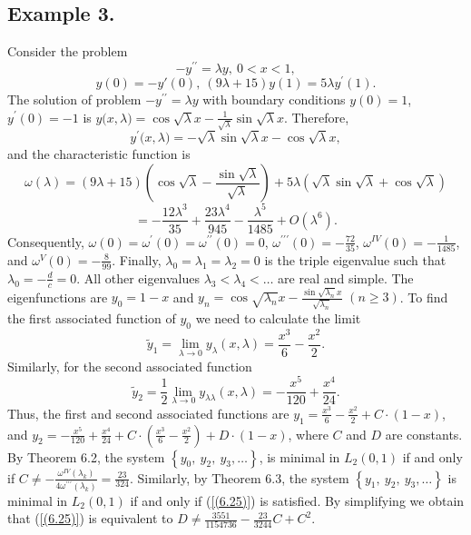 \documentclass[pdflatex,sn-mathphys-num]{sn-jnl}%
\theoremstyle{thmstyleone}%
\theoremstyle{thmstyletwo}%
\theoremstyle{thmstylethree}%
\theoremstyle{definition}
\theoremstyle{remark}
\numberwithin{equation}{section}
\begin{document}
\subsection*{Example 3.}Consider the problem  
$$
-y^{\prime \prime }=\lambda y,\ 0<x<1,
$$
$$
y(0)=-y'(0),\ 
(9{\lambda}+15)y(1)= 5{\lambda }y^{\prime }(1).
$$
The solution of problem $-y^{\prime \prime }=\lambda y$ with boundary conditions $y(0)=1$, $y^\prime(0)=-1$ is $y({x,\lambda)}=\cos{\sqrt{\lambda}x}-\frac{1}{\sqrt{\lambda}}\sin{\sqrt{\lambda}x}$. Therefore, $$y^\prime({x,\lambda)}=-\sqrt{\lambda}\sin{\sqrt{\lambda}x}-\cos{\sqrt{\lambda}x},$$and
the characteristic function is $$\omega(\lambda) = (9{\lambda}+15)\left(\cos{\sqrt{\lambda}}-\frac{\sin{\sqrt{\lambda}}}{{\sqrt{\lambda}}} \right)+5\lambda\left(\sqrt{\lambda}\sin{\sqrt{\lambda}} +\cos{\sqrt{\lambda}}\right)
$$
$$
=-\frac{12\lambda^{3}}{35}+\frac{23\lambda^{4}}{945}-\frac{\lambda^{5}}{1485}+O(\lambda^{6}).
$$
Consequently, $\omega(0)=\omega^\prime(0)=\omega^{\prime\prime}(0)=0$, $\omega^{\prime\prime\prime}(0)=-\frac{72}{35}$, $\omega^{IV}(0)=-\frac{1}{1485}$, and $\omega^{V}(0)=-\frac{8}{99}$.
Finally, $\lambda _{0}=\lambda _{1}=\lambda _{2}=0$ is the triple eigenvalue such that $\lambda _{0}=-\frac{d}{c}=0$. All other eigenvalues $\lambda _{3}<\lambda _{4}<\ldots$ are real and simple.
The eigenfunctions are $y_{0}=1-x$ and $y_{n}=\cos{\sqrt{\lambda _{n}}x}-\frac{\sin{\sqrt{\lambda_n}x}}{{\sqrt{\lambda_n}}}$ $(n\ge 3)$.
To find the first associated function of $y_{0}$ we need to calculate the limit
$$\tilde{y}_1=\lim_{\lambda\to 0}y_\lambda(x,\lambda)=\frac{x^3}{6}-\frac{x^2}{2}.$$
Similarly, for the second associated function
$$\tilde{y}_2=\frac{1}{2}\lim_{\lambda\to 0}y_{\lambda\lambda}(x,\lambda)=-\frac{x^5}{120}+\frac{x^4}{24}.$$
Thus, the first and second associated functions are 
$y_{1}=\frac{x^{3}}{6}-\frac{x^{2}}{2}+C\cdot \left(1-x\right)$, and $y_{2}=-\frac{x^{5}}{120}+\frac{x^{4}}{24}+C\cdot \left(\frac{x^{3}}{6}-\frac{x^{2}}{2}\right)+{D}\cdot \left(1-x\right)$, where $C$ and $D$ are constants. 
By Theorem 6.2,
the system $\left\{ y_{0},\ y_{2},\ y_{3},\ldots\right\}$, is minimal in $L_2(0,1)$ if and only if $C\neq-\frac{\omega^{IV}(\lambda_k)}{4\omega^{\prime\prime\prime}(\lambda_k)}=\frac{23}{324}$. 
Similarly, by Theorem 6.3,
the system $\left\{ y_{1},\ y_{2},\ y_{3},\ldots\right\}$ is minimal in $L_2(0,1)$ if and only if (\ref{(6.25)}) is satisfied. By simplifying we obtain that (\ref{(6.25)}) is equivalent to $D\ne\frac{3551}{1154736}-\frac{23}{3244} C+C^{2}$.
\end{document}
